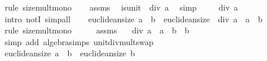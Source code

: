 \begin{isabellebody}
\ {\isacharparenleft}{\kern0pt}rule\ size{\isacharunderscore}{\kern0pt}mult{\isacharunderscore}{\kern0pt}mono{\isacharprime}{\kern0pt}{\isacharparenright}{\kern0pt}\isanewline
\ \ \isamarkupfalse%
\ assms\ \isamarkupfalse%
\ {\isachardoublequoteopen}is{\isacharunderscore}{\kern0pt}unit\ {\isacharparenleft}{\kern0pt}{}\ div\ a{\isacharparenright}{\kern0pt}{\isachardoublequoteclose}\ \isamarkupfalse%
\ simp\isanewline
\ \ \isamarkupfalse%
\ {\isachardoublequoteopen}{}\ div\ a\ {\isasymnoteq}\ {}{\isachardoublequoteclose}\ \isamarkupfalse%
\ {\isacharparenleft}{\kern0pt}intro\ notI{\isacharparenright}{\kern0pt}\ simp{\isacharunderscore}{\kern0pt}all\isanewline
\ \ \isamarkupfalse%
\ {\isachardoublequoteopen}euclidean{\isacharunderscore}{\kern0pt}size\ {\isacharparenleft}{\kern0pt}a\ {\isacharasterisk}{\kern0pt}\ b{\isacharparenright}{\kern0pt}\ {\isasymle}\ euclidean{\isacharunderscore}{\kern0pt}size\ {\isacharparenleft}{\kern0pt}{\isacharparenleft}{\kern0pt}{}\ div\ a{\isacharparenright}{\kern0pt}\ {\isacharasterisk}{\kern0pt}\ {\isacharparenleft}{\kern0pt}a\ {\isacharasterisk}{\kern0pt}\ b{\isacharparenright}{\kern0pt}{\isacharparenright}{\kern0pt}{\isachardoublequoteclose}\isanewline
\ \ \ \ \isamarkupfalse%
\ {\isacharparenleft}{\kern0pt}rule\ size{\isacharunderscore}{\kern0pt}mult{\isacharunderscore}{\kern0pt}mono{\isacharprime}{\kern0pt}{\isacharparenright}{\kern0pt}\isanewline
\ \ \isamarkupfalse%
\ \isamarkupfalse%
\ assms\ \isamarkupfalse%
\ {\isachardoublequoteopen}{\isacharparenleft}{\kern0pt}{}\ div\ a{\isacharparenright}{\kern0pt}\ {\isacharasterisk}{\kern0pt}\ {\isacharparenleft}{\kern0pt}a\ {\isacharasterisk}{\kern0pt}\ b{\isacharparenright}{\kern0pt}\ {\isacharequal}{\kern0pt}\ b{\isachardoublequoteclose}\isanewline
\ \ \ \ \isamarkupfalse%
\ {\isacharparenleft}{\kern0pt}simp\ add{\isacharcolon}{\kern0pt}\ algebra{\isacharunderscore}{\kern0pt}simps\ unit{\isacharunderscore}{\kern0pt}div{\isacharunderscore}{\kern0pt}mult{\isacharunderscore}{\kern0pt}swap{\isacharparenright}{\kern0pt}\isanewline
\ \ \isamarkupfalse%
\ \isamarkupfalse%
\ {\isachardoublequoteopen}euclidean{\isacharunderscore}{\kern0pt}size\ {\isacharparenleft}{\kern0pt}a\ {\isacharasterisk}{\kern0pt}\ b{\isacharparenright}{\kern0pt}\ {\isasymle}\ euclidean{\isacharunderscore}{\kern0pt}size\ b{\isachardoublequoteclose}\ \isacommand{{\isachardot}{\kern0pt}}\isamarkupfalse%

\end{isabellebody}
